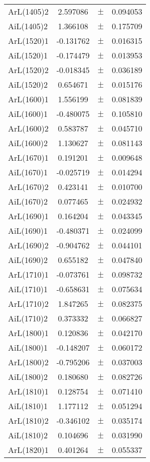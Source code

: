 \begin{table}
\begin{tiny}
\begin{tabular}{lccc}
ArL(1405)2 & 2.597086 & $\pm$ & 0.094053 \\
AiL(1405)2 & 1.366108 & $\pm$ & 0.175709 \\
ArL(1520)1 & -0.131762 & $\pm$ & 0.016315 \\
AiL(1520)1 & -0.174479 & $\pm$ & 0.013953 \\
ArL(1520)2 & -0.018345 & $\pm$ & 0.036189 \\
AiL(1520)2 & 0.654671 & $\pm$ & 0.015176 \\
ArL(1600)1 & 1.556199 & $\pm$ & 0.081839 \\
AiL(1600)1 & -0.480075 & $\pm$ & 0.105810 \\
ArL(1600)2 & 0.583787 & $\pm$ & 0.045710 \\
AiL(1600)2 & 1.130627 & $\pm$ & 0.081143 \\
ArL(1670)1 & 0.191201 & $\pm$ & 0.009648 \\
AiL(1670)1 & -0.025719 & $\pm$ & 0.014294 \\
ArL(1670)2 & 0.423141 & $\pm$ & 0.010700 \\
AiL(1670)2 & 0.077465 & $\pm$ & 0.024932 \\
ArL(1690)1 & 0.164204 & $\pm$ & 0.043345 \\
AiL(1690)1 & -0.480371 & $\pm$ & 0.024099 \\
ArL(1690)2 & -0.904762 & $\pm$ & 0.044101 \\
AiL(1690)2 & 0.655182 & $\pm$ & 0.047840 \\
ArL(1710)1 & -0.073761 & $\pm$ & 0.098732 \\
AiL(1710)1 & -0.658631 & $\pm$ & 0.075634 \\
ArL(1710)2 & 1.847265 & $\pm$ & 0.082375 \\
AiL(1710)2 & 0.373332 & $\pm$ & 0.066827 \\
ArL(1800)1 & 0.120836 & $\pm$ & 0.042170 \\
AiL(1800)1 & -0.148207 & $\pm$ & 0.060172 \\
ArL(1800)2 & -0.795206 & $\pm$ & 0.037003 \\
AiL(1800)2 & 0.180680 & $\pm$ & 0.082726 \\
ArL(1810)1 & 0.128754 & $\pm$ & 0.071410 \\
AiL(1810)1 & 1.177112 & $\pm$ & 0.051294 \\
ArL(1810)2 & -0.346102 & $\pm$ & 0.035174 \\
AiL(1810)2 & 0.104696 & $\pm$ & 0.031990 \\
ArL(1820)1 & 0.401264 & $\pm$ & 0.055337 \\

\end{tabular}
\end{tiny}
\end{table}
